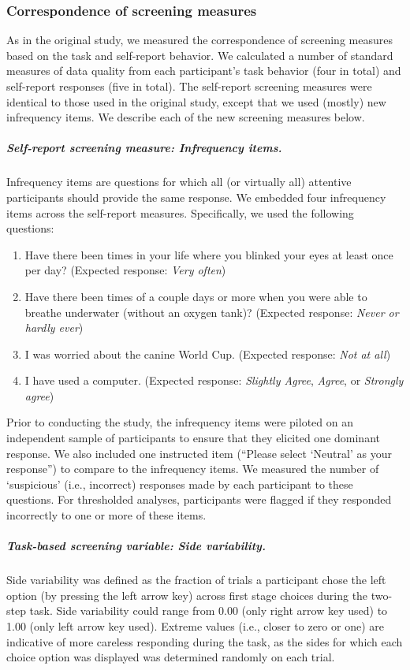\documentclass[a4paper,notitlepage,12pt]{article}
\begin{document}
\subsubsection*{Correspondence of screening measures}

As in the original study, we measured the correspondence of screening measures based on the task and self-report behavior. We calculated a number of standard measures of data quality from each participant's task behavior (four in total) and self-report responses (five in total). The self-report screening measures were identical to those used in the original study, except that we used (mostly) new infrequency items. We describe each of the new screening measures below.

\subparagraph{Self-report screening measure: Infrequency items.} Infrequency items are questions for which all (or virtually all) attentive participants should provide the same response. We embedded four infrequency items across the self-report measures. Specifically, we used the following questions:

\begin{enumerate}
  \item Have there been times in your life where you blinked your eyes at least once per day? (Expected response: \textit{Very often})
  \item Have there been times of a couple days or more when you were able to breathe underwater (without an oxygen tank)? (Expected response: \textit{Never or hardly ever})
  \item I was worried about the canine World Cup. (Expected response: \textit{Not at all})
  \item I have used a computer. (Expected response: \textit{Slightly Agree}, \textit{Agree}, or \textit{Strongly agree})
\end{enumerate}

Prior to conducting the study, the infrequency items were piloted on an independent sample of participants to ensure that they elicited one dominant response. We also included one instructed item (``Please select `Neutral' as your response'') to compare to the infrequency items. We measured the number of `suspicious' (i.e., incorrect) responses made by each participant to these questions. For thresholded analyses, participants were flagged if they responded incorrectly to one or more of these items. 

\subparagraph{Task-based screening variable: Side variability.} Side variability was defined as the fraction of trials a participant chose the left option (by pressing the left arrow key) across first stage choices during the two-step task. Side variability could range from 0.00 (only right arrow key used) to 1.00 (only left arrow key used). Extreme values (i.e., closer to zero or one) are indicative of more careless responding during the task, as the sides for which each choice option was displayed was determined randomly on each trial.  
\end{document}
